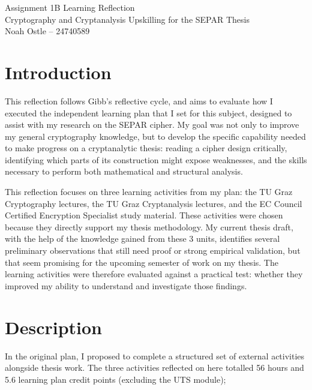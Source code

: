 \documentclass[11pt]{article}
\begin{document}
\begin{center}
{\Large Assignment 1B Learning Reflection}\\[0.4em]
{\large Cryptography and Cryptanalysis Upskilling for the SEPAR Thesis}\\[0.8em]
Noah Ostle -- 24740589
\end{center}

\section*{Introduction}

This reflection follows Gibb's reflective cycle, and aims to evaluate how I executed the independent learning plan that I set for this subject, designed to assist with my research on the SEPAR cipher. My goal was not only to improve my general cryptography knowledge, but to develop the specific capability needed to make progress on a cryptanalytic thesis: reading a cipher design critically, identifying which parts of its construction might expose weaknesses, and the skills necessary to perform both mathematical and structural analysis.

This reflection focuses on three learning activities from my plan: the TU Graz Cryptography lectures, the TU Graz Cryptanalysis lectures, and the EC Council Certified Encryption Specialist study material. These activities were chosen because they directly support my thesis methodology. My current thesis draft, with the help of the knowledge gained from these 3 units, identifies several preliminary observations that still need proof or strong empirical validation, but that seem promising for the upcoming semester of work on my thesis. The learning activities were therefore evaluated against a practical test: whether they improved my ability to understand and investigate those findings.

\section*{Description}

In the original plan, I proposed to complete a structured set of external activities alongside thesis work. The three activities reflected on here totalled 56 hours and 5.6 learning plan credit points (excluding the UTS module);
\end{document}
